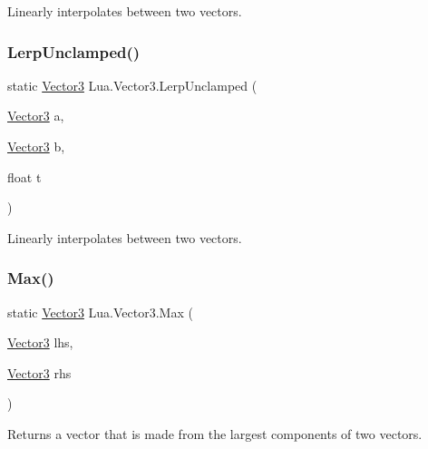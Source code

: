 Linearly interpolates between two vectors. 

\mbox{\label{class_lua_1_1_vector3_a63b62cb18ab91477aee5c9bd0d975400}} 
\subsubsection{\texorpdfstring{LerpUnclamped()}{LerpUnclamped()}}
{\footnotesize\ttfamily static \mbox{\hyperlink{class_lua_1_1_vector3}{Vector3}} Lua.\+Vector3.\+Lerp\+Unclamped (\begin{DoxyParamCaption}\item[{\mbox{\hyperlink{class_lua_1_1_vector3}{Vector3}}}]{a,  }\item[{\mbox{\hyperlink{class_lua_1_1_vector3}{Vector3}}}]{b,  }\item[{float}]{t }\end{DoxyParamCaption})\hspace{0.3cm}{\ttfamily [static]}}



Linearly interpolates between two vectors. 

\mbox{\label{class_lua_1_1_vector3_a3495c2bc3847d7ec201c1e4209359c25}} 
\subsubsection{\texorpdfstring{Max()}{Max()}}
{\footnotesize\ttfamily static \mbox{\hyperlink{class_lua_1_1_vector3}{Vector3}} Lua.\+Vector3.\+Max (\begin{DoxyParamCaption}\item[{\mbox{\hyperlink{class_lua_1_1_vector3}{Vector3}}}]{lhs,  }\item[{\mbox{\hyperlink{class_lua_1_1_vector3}{Vector3}}}]{rhs }\end{DoxyParamCaption})\hspace{0.3cm}{\ttfamily [static]}}



Returns a vector that is made from the largest components of two vectors. 

\mbox{\label{class_lua_1_1_vector3_a514e1f8b6c974e522e290ccf3f113a7e}} 
